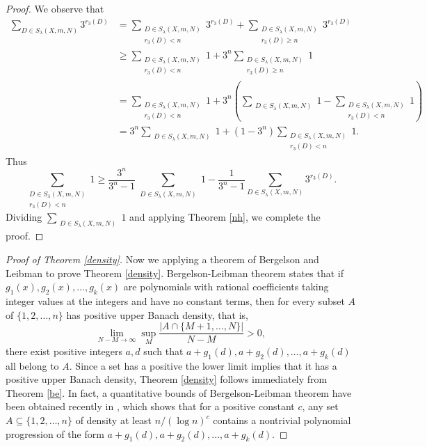\documentclass{amsart}
\begin{document}
\begin{proof}
We observe that
\[
\begin{aligned}
 \sum_{D \in S_{\lambda}(X, m, N)} 3^{r_{3}(D)}
& =\sum_{\substack{D \in S_{\lambda}(X, m, N) \\
r_{3}(D)<n}} 3^{r_{3}(D)}+\sum_{\substack{D \in S_{\lambda}(X, m, N) \\
r_{3}(D) \geq n}} 3^{r_{3}(D)} \\
& \ge \sum_{\substack{D \in S_{\lambda}(X, m, N) \\
r_{3}(D)<n}} 1+3^n\sum_{\substack{D \in S_{\lambda}(X, m, N) \\
r_{3}(D) \geq n}} 1\\
&=\sum_{\substack{D \in S_{\lambda}(X, m, N) \\
r_{3}(D)<n}} 1+3^n\left(\sum_{\substack{D \in S_{\lambda}(X, m, N) }} 1-\sum_{\substack{D \in S_{\lambda}(X, m, N) \\
r_{3}(D) < n}} 1\right)\\
&=3^n\sum_{\substack{D \in S_{\lambda}(X, m, N) }} 1+(1-3^n)\sum_{\substack{D \in S_{\lambda}(X, m, N) \\
r_{3}(D) < n}} 1.
\end{aligned}
\]
Thus
\[ \sum_{\substack{D \in S_{\lambda}(X, m, N) \\
r_{3}(D) < n}} 1
\ge \frac{3^n}{3^n-1}\sum_{\substack{D \in S_{\lambda}(X, m, N) }} 1-\frac{1}{3^n-1}\sum_{D \in S_{\lambda}(X, m, N)} 3^{r_{3}(D)}.\]
Dividing $\sum_{\substack{D \in S_{\lambda}(X, m, N) }}1$ and applying Theorem \ref{nh}, we complete the proof.

\end{proof}
\begin{proof}[Proof of Theorem \ref{density}]
Now we applying a theorem of Bergelson and Leibman \cite[Theorem B]{bl} to prove Theorem \ref{density}.
 Bergelson-Leibman  theorem states that
if $g_1(x), g_2(x), \ldots,g_k(x)$ are polynomials with rational coefficients   taking integer values at the integers and have no constant terms, then for every subset $A$ of $\{1, 2, \ldots ,n\}$ has positive upper Banach density, that is, \[\lim_{N-M\rightarrow\infty}\sup_M\frac{ |A\cap\{M+1,\ldots,N\}|}{N-M}>0,\]  there exist positive integers $a, d$ such that $a+g_1(d), a+g_2(d), \ldots, a+g_k(d)$ all belong to $A$.  Since a set has a positive the lower limit implies that it has a positive upper Banach density, Theorem \ref{density} follows immediately from Theorem \ref{be}. In fact, a quantitative bounds of Bergelson-Leibman  theorem have been obtained recently in \cite{sw}, which shows that for a positive constant $c$, any set $A \subseteq\{1, 2, \ldots ,n\}$  of density at least $n/(\log n)^c$  contains a nontrivial polynomial progression of the form $a+g_1(d), a+g_2(d),\ldots,a+g_k(d)$.
 \end{proof}
\end{document}
